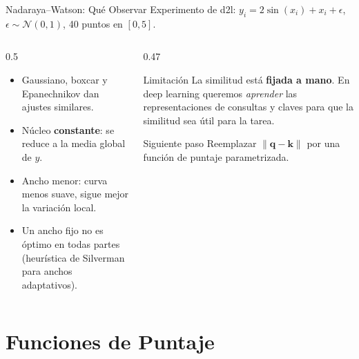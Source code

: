 \documentclass[aspectratio=169, 10pt]{beamer}
\newcommand{\qv}{\mathbf{q}}
\newcommand{\kv}{\mathbf{k}}
\begin{document}
\begin{frame}{Nadaraya--Watson: Qu\'e Observar}
	Experimento de d2l: $y_i=2\sin(x_i)+x_i+\epsilon$, $\epsilon\sim\mathcal{N}(0,1)$, 40 puntos en $[0,5]$.
	\begin{columns}[T]
		\begin{column}{0.5\textwidth}
			\begin{itemize}
				\item Gaussiano, boxcar y Epanechnikov dan ajustes similares.
				\item N\'ucleo \textbf{constante}: se reduce a la media global de $y$.
				\item Ancho menor: curva menos suave, sigue mejor la variaci\'on local.
				\item Un ancho fijo no es \'optimo en todas partes (heur\'istica de Silverman para anchos adaptativos).
			\end{itemize}
		\end{column}
		\begin{column}{0.47\textwidth}
			\begin{alertblock}{Limitaci\'on}
				La similitud est\'a \textbf{fijada a mano}. En deep learning queremos \emph{aprender} las representaciones de consultas y claves para que la similitud sea \'util para la tarea.
			\end{alertblock}
			\begin{block}{Siguiente paso}
				Reemplazar $\|\qv-\kv\|$ por una funci\'on de puntaje parametrizada.
			\end{block}
		\end{column}
	\end{columns}
\end{frame}

\section{Funciones de Puntaje}
\end{document}
